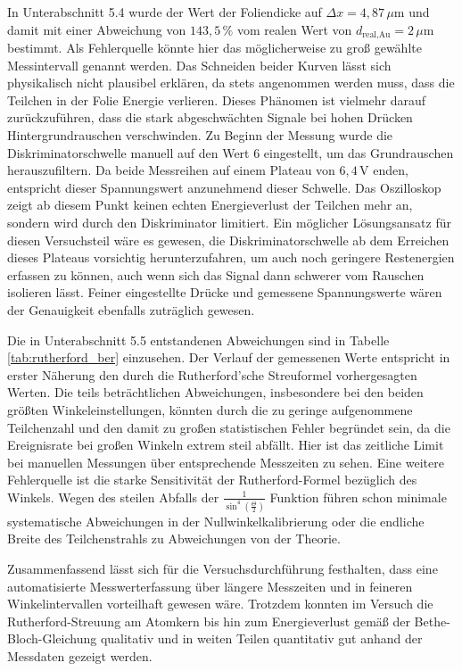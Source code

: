 In Unterabschnitt 5.4 wurde der Wert der Foliendicke auf $\Delta x = 4{,}87\,\mu\text{m}$ und damit mit einer Abweichung von $143{,}5\,\%$ vom realen Wert von $d_{\text{real,Au}} = 2\,\mu\text{m}$ bestimmt. Als Fehlerquelle könnte hier das möglicherweise zu groß gewählte Messintervall genannt werden. Das Schneiden beider Kurven lässt sich physikalisch nicht plausibel erklären, da stets angenommen werden muss, dass die Teilchen in der Folie Energie verlieren. Dieses Phänomen ist vielmehr darauf zurückzuführen, dass die stark abgeschwächten Signale bei hohen Drücken Hintergrundrauschen verschwinden. Zu Beginn der Messung wurde die Diskriminatorschwelle manuell auf den Wert 6 eingestellt, um das Grundrauschen herauszufiltern. Da beide Messreihen auf einem Plateau von $6{,}4\,\text{V}$ enden, entspricht dieser Spannungswert anzunehmend dieser Schwelle. Das Oszilloskop zeigt ab diesem Punkt keinen echten Energieverlust der Teilchen mehr an, sondern wird durch den Diskriminator limitiert. Ein möglicher Lösungsansatz für diesen Versuchsteil wäre es gewesen, die Diskriminatorschwelle ab dem Erreichen dieses Plateaus vorsichtig herunterzufahren, um auch noch geringere Restenergien erfassen zu können, auch wenn sich das Signal dann schwerer vom Rauschen isolieren lässt. Feiner eingestellte Drücke und gemessene Spannungswerte wären der Genauigkeit ebenfalls zuträglich gewesen. 

Die in Unterabschnitt 5.5 entstandenen Abweichungen sind in Tabelle \ref{tab:rutherford_ber} einzusehen. Der Verlauf der gemessenen Werte entspricht in erster Näherung den durch die Rutherford'sche Streuformel vorhergesagten Werten. Die teils beträchtlichen Abweichungen, insbesondere bei den beiden größten Winkeleinstellungen, könnten durch die zu geringe aufgenommene Teilchenzahl und den damit zu großen statistischen Fehler begründet sein, da die Ereignisrate bei großen Winkeln extrem steil abfällt. Hier ist das zeitliche Limit bei manuellen Messungen über entsprechende Messzeiten zu sehen. Eine weitere Fehlerquelle ist die starke Sensitivität der Rutherford-Formel bezüglich des Winkels. Wegen des steilen Abfalls der $\frac{1}{\sin^4\left(\frac{\Theta}{2}\right)}$ Funktion führen schon minimale systematische Abweichungen in der Nullwinkelkalibrierung oder die endliche Breite des Teilchenstrahls zu Abweichungen von der Theorie.

Zusammenfassend lässt sich für die Versuchsdurchführung festhalten, dass eine automatisierte Messwerterfassung über längere Messzeiten und in feineren Winkelintervallen vorteilhaft gewesen wäre. Trotzdem konnten im Versuch die Rutherford-Streuung am Atomkern bis hin zum Energieverlust gemäß der Bethe-Bloch-Gleichung qualitativ und in weiten Teilen quantitativ gut anhand der Messdaten gezeigt werden.








